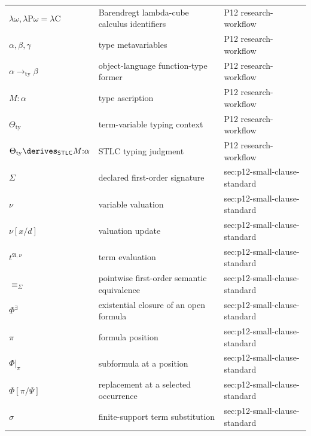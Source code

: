 \begin{longtable}{@{}p{}p{}p{}@{}}
\(\lambda\omega,\allowbreak \lambda\mathrm P\omega=\lambda\mathrm C\) & Barendregt lambda-cube calculus identifiers & P12 research-\allowbreak{}workflow \\
\(\alpha,\allowbreak \beta,\allowbreak \gamma\) & type metavariables & P12 research-\allowbreak{}workflow \\
\(\alpha\to_{\mathrm{ty}}\beta\) & object-language function-type former & P12 research-\allowbreak{}workflow \\
\(M{:}\alpha\) & type ascription & P12 research-\allowbreak{}workflow \\
\(\Theta_{\mathrm{ty}}\) & term-variable typing context & P12 research-\allowbreak{}workflow \\
\(\Theta_{\mathrm{ty}}\derives_{\mathsf{STLC}}M{:}\alpha\) & STLC typing judgment & P12 research-\allowbreak{}workflow \\
\(\Sigma\) & declared first-order signature & sec:\allowbreak{}p12-\allowbreak{}small-\allowbreak{}clause-\allowbreak{}standard \\
\(\nu\) & variable valuation & sec:\allowbreak{}p12-\allowbreak{}small-\allowbreak{}clause-\allowbreak{}standard \\
\(\nu[x/d]\) & valuation update & sec:\allowbreak{}p12-\allowbreak{}small-\allowbreak{}clause-\allowbreak{}standard \\
\(t^{\mathfrak A,\nu}\) & term evaluation & sec:\allowbreak{}p12-\allowbreak{}small-\allowbreak{}clause-\allowbreak{}standard \\
\(\equiv_\Sigma\) & pointwise first-order semantic equivalence & sec:\allowbreak{}p12-\allowbreak{}small-\allowbreak{}clause-\allowbreak{}standard \\
\(\Phi^\exists\) & existential closure of an open formula & sec:\allowbreak{}p12-\allowbreak{}small-\allowbreak{}clause-\allowbreak{}standard \\
\(\pi\) & formula position & sec:\allowbreak{}p12-\allowbreak{}small-\allowbreak{}clause-\allowbreak{}standard \\
\(\Phi|_\pi\) & subformula at a position & sec:\allowbreak{}p12-\allowbreak{}small-\allowbreak{}clause-\allowbreak{}standard \\
\(\Phi[\pi/\Psi]\) & replacement at a selected occurrence & sec:\allowbreak{}p12-\allowbreak{}small-\allowbreak{}clause-\allowbreak{}standard \\
\(\sigma\) & finite-support term substitution & sec:\allowbreak{}p12-\allowbreak{}small-\allowbreak{}clause-\allowbreak{}standard \\

\end{longtable}
